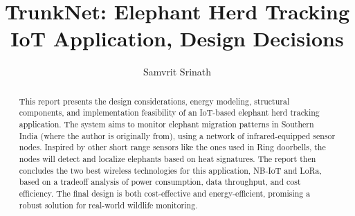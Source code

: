 \documentclass[sigconf,letterpaper,10pt,nonacm]{acmart}
\begin{document}
\title{TrunkNet: Elephant Herd Tracking IoT Application, Design Decisions}
\author{Samvrit Srinath}

\begin{abstract}
    This report presents the design considerations, energy modeling, structural components, and implementation feasibility of an IoT-based elephant herd tracking application. The system aims to monitor elephant migration patterns in Southern India (where the author is originally from), using a network of infrared-equipped sensor nodes. Inspired by other short range sensors like the ones used in Ring doorbells, the nodes will detect and localize elephants based on heat signatures. The report then concludes the two best wireless technologies for this application, NB-IoT and LoRa, based on a tradeoff analysis of power consumption, data throughput, and cost efficiency. The final design is both cost-effective and energy-efficient, promising a robust solution for real-world wildlife monitoring.
\end{abstract}

\maketitle





% 






\end{document}
